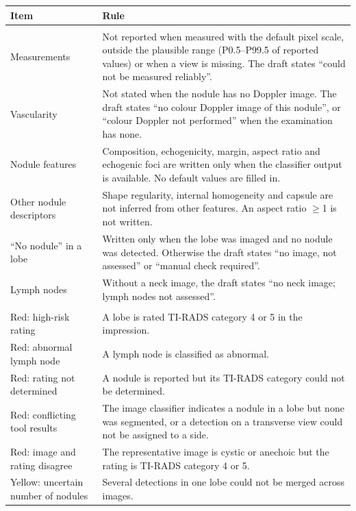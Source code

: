 \documentclass[fleqn,10pt]{wlscirep}
\begin{document}
\begin{appendices}
\begin{table}[p]
\begin{threeparttable}
\begin{tabular}{>{\raggedright\arraybackslash}p{}>{\raggedright\arraybackslash}p{}}
\toprule
\textbf{Item} & \textbf{Rule} \\
\midrule
\rowcolor{gray!20}
\multicolumn{2}{c}{\textbf{Layer 1: statements not written}} \\
Measurements & Not reported when measured with the default pixel scale, outside the plausible range (P0.5--P99.5 of reported values) or when a view is missing. The draft states ``could not be measured reliably''. \\
Vascularity & Not stated when the nodule has no Doppler image. The draft states ``no colour Doppler image of this nodule'', or ``colour Doppler not performed'' when the examination has none. \\
Nodule features & Composition, echogenicity, margin, aspect ratio and echogenic foci are written only when the classifier output is available. No default values are filled in. \\
Other nodule descriptors & Shape regularity, internal homogeneity and capsule are not inferred from other features. An aspect ratio $\geq$1 is not written. \\
``No nodule'' in a lobe & Written only when the lobe was imaged and no nodule was detected. Otherwise the draft states ``no image, not assessed'' or ``manual check required''. \\
Lymph nodes & Without a neck image, the draft states ``no neck image; lymph nodes not assessed''. \\
\midrule
\rowcolor{gray!20}
\multicolumn{2}{c}{\textbf{Layer 2: sentence marks for physician review}} \\
Red: high-risk rating & A lobe is rated TI-RADS category 4 or 5 in the impression. \\
Red: abnormal lymph node & A lymph node is classified as abnormal. \\
Red: rating not determined & A nodule is reported but its TI-RADS category could not be determined. \\
Red: conflicting tool results & The image classifier indicates a nodule in a lobe but none was segmented, or a detection on a transverse view could not be assigned to a side. \\
Red: image and rating disagree & The representative image is cystic or anechoic but the rating is TI-RADS category 4 or 5. \\
Yellow: uncertain number of nodules & Several detections in one lobe could not be merged across images. \\

\end{tabular}
\end{threeparttable}
\end{table}
\end{appendices}
\end{document}
